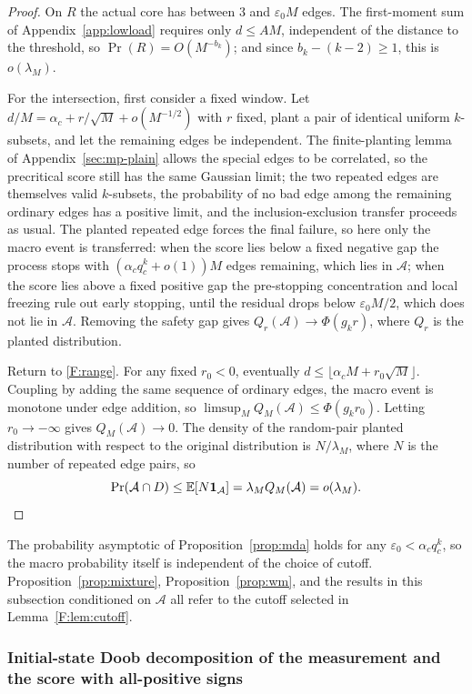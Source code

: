 \begin{proof}
On $R$ the actual core has between $3$ and $\varepsilon_0M$ edges. The first-moment sum of
Appendix~\ref{app:lowload} requires only $d\le AM$, independent of the distance to the threshold,
so $\Pr(R)=O(M^{-b_k})$; and since $b_k-(k-2)\ge1$, this is $o(\lambda_M)$.

For the intersection, first consider a fixed window. Let
$d/M=\alpha_c+r/\sqrt M+o(M^{-1/2})$ with $r$ fixed, plant a pair of identical uniform
$k$-subsets, and let the remaining edges be independent. The finite-planting lemma of
Appendix~\ref{sec:mp-plain} allows the special edges to be correlated, so the precritical score
still has the same Gaussian limit; the two repeated edges are themselves valid $k$-subsets, the
probability of no bad edge among the remaining ordinary edges has a positive limit, and the
inclusion-exclusion transfer proceeds as usual. The planted repeated edge forces the final
failure, so here only the macro event is transferred: when the score lies below a fixed negative
gap the process stops with $(\alpha_cq_c^k+o(1))M$ edges remaining, which lies in $\mathcal A$;
when the score lies above a fixed positive gap the pre-stopping concentration and local freezing
rule out early stopping, until the residual drops below $\varepsilon_0M/2$, which does not lie in
$\mathcal A$. Removing the safety gap gives $Q_r(\mathcal A)\to\Phi(g_kr)$, where $Q_r$ is the
planted distribution.

Return to \eqref{F:range}. For any fixed $r_0<0$, eventually
$d\le\lfloor\alpha_cM+r_0\sqrt M\rfloor$. Coupling by adding the same sequence of ordinary edges,
the macro event is monotone under edge addition, so
$\limsup_MQ_M(\mathcal A)\le\Phi(g_kr_0)$. Letting $r_0\to-\infty$ gives $Q_M(\mathcal A)\to0$.
The density of the random-pair planted distribution with respect to the original distribution is
$N/\lambda_M$, where $N$ is the number of repeated edge pairs, so
\[
\Pr(\mathcal A\cap D)\le\mathbb E[N\mathbf1_{\mathcal A}]=\lambda_MQ_M(\mathcal A)=o(\lambda_M).\qedhere
\]
\end{proof}

The probability asymptotic of Proposition~\ref{prop:mda} holds for any
$\varepsilon_0<\alpha_cq_c^k$, so the macro probability itself is independent of the choice of
cutoff. Proposition~\ref{prop:mixture}, Proposition~\ref{prop:wm}, and the results in this
subsection conditioned on $\mathcal A$ all refer to the cutoff selected in
Lemma~\ref{F:lem:cutoff}.

\subsubsection{Initial-state Doob decomposition of the measurement and the score with all-positive signs}

